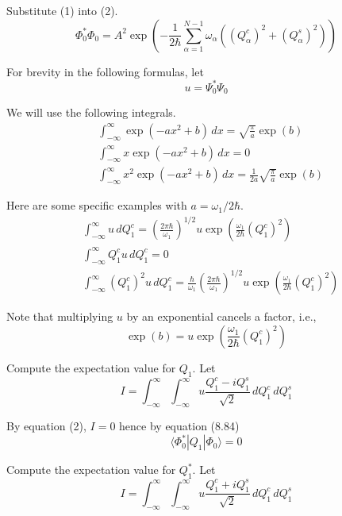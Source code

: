 \documentclass[12pt]{article}
\begin{document}
Substitute (1) into (2).
\begin{equation*}
\Phi_0^*\Phi_0
=A^2\exp\left(
-\frac{1}{2\hbar}
\sum_{\alpha=1}^{N-1}
\omega_\alpha\left((Q_\alpha^c)^2+(Q_\alpha^s)^2\right)
\right)
\end{equation*}

For brevity in the following formulas, let
\begin{equation*}
u=\Psi_0^*\Psi_0
\end{equation*}

We will use the following integrals.
\begin{align*}
&\int_{-\infty}^\infty\exp(-ax^2+b)\,dx=\sqrt{\frac{\pi}{a}}\exp(b)
\tag{1}
\\
&\int_{-\infty}^\infty x\exp(-ax^2+b)\,dx=0
\tag{2}
\\
&\int_{-\infty}^\infty x^2\exp(-ax^2+b)\,dx=\frac{1}{2a}\sqrt{\frac{\pi}{a}}\exp(b)
\tag{3}
\end{align*}

Here are some specific examples with $a=\omega_1/2\hbar$.
\begin{align*}
&\int_{-\infty}^\infty u\,dQ_1^c=\left(\frac{2\pi\hbar}{\omega_1}\right)^{1/2}
u\exp\left(\frac{\omega_1}{2\hbar}(Q_1^c)^2\right)
\tag{4}
\\
&\int_{-\infty}^\infty Q_1^cu\,dQ_1^c=0
\tag{5}
\\
&\int_{-\infty}^\infty (Q_1^c)^2u\,dQ_1^c=\frac{\hbar}{\omega_1}
\left(\frac{2\pi\hbar}{\omega_1}\right)^{1/2}
u\exp\left(\frac{\omega_1}{2\hbar}(Q_1^c)^2\right)
\tag{6}
\end{align*}

Note that multiplying $u$ by an exponential cancels a factor, i.e.,
\begin{equation*}
\exp(b)=u\exp\left(\frac{\omega_1}{2\hbar}(Q_1^c)^2\right)
\end{equation*}

Compute the expectation value for $Q_1$.
Let
\begin{equation*}
I=\int_{-\infty}^\infty\int_{-\infty}^\infty
u\frac{Q_1^c-iQ_1^s}{\sqrt2}
\,dQ_1^c\,dQ_1^s
\end{equation*}

By equation (2), $I=0$ hence by equation (8.84)
\begin{equation*}
\langle\Phi_0^*|Q_1|\Phi_0\rangle=0
\end{equation*}

Compute the expectation value for $Q_1^*$.
Let
\begin{equation*}
I=\int_{-\infty}^\infty\int_{-\infty}^\infty
u\frac{Q_1^c+iQ_1^s}{\sqrt2}
\,dQ_1^c\,dQ_1^s
\end{equation*}
\end{document}
